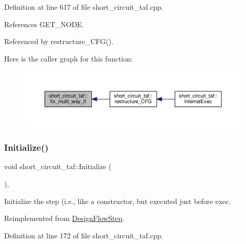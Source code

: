 Definition at line 617 of file short\+\_\+circuit\+\_\+taf.\+cpp.



References G\+E\+T\+\_\+\+N\+O\+DE.



Referenced by restructure\+\_\+\+C\+F\+G().

Here is the caller graph for this function\+:
\nopagebreak
\begin{figure}[H]
\begin{center}
\leavevmode
\includegraphics[width=350pt]{dd/d1c/classshort__circuit__taf_a295d6fe0b5076cb8c4b21b0de330677b_icgraph}
\end{center}
\end{figure}
\mbox{\label{classshort__circuit__taf_ab6bd4b50e2ab5bd53ab964156829ce6b}} 
\subsubsection{\texorpdfstring{Initialize()}{Initialize()}}
{\footnotesize\ttfamily void short\+\_\+circuit\+\_\+taf\+::\+Initialize (\begin{DoxyParamCaption}{ }\end{DoxyParamCaption})\hspace{0.3cm}{\ttfamily [override]}, {\ttfamily [virtual]}}



Initialize the step (i.\+e., like a constructor, but executed just before exec. 



Reimplemented from \hyperlink{classDesignFlowStep_a44b50683382a094976e1d432a7784799}{Design\+Flow\+Step}.



Definition at line 172 of file short\+\_\+circuit\+\_\+taf.\+cpp.

\mbox{\label{classshort__circuit__taf_a859bc9ef4199b52ef26a8bd39fcb699b}} 
